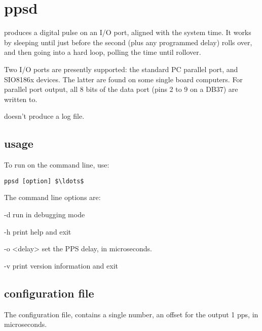 \section{ppsd \label{s:ppsd}}

 produces a digital pulse on an I/O port, aligned with the system time.
It works by sleeping until just before the second (plus any programmed delay) rolls over, 
and then going into a hard loop, polling the time until rollover.

Two I/O ports are presently supported: the standard PC parallel port, and SIO8186x devices.
The latter are found on some single board computers. For parallel port output, all 8 bits 
of the data port (pins 2 to 9 on a DB37) are written to.

 doesn't produce a log file.

\subsection{usage}

To run  on the command line, use:
\begin{lstlisting}[mathescape=true]
ppsd [option] $\ldots$
\end{lstlisting}
The command line options are:
\begin{description*}
	\item[-d]	run in debugging mode
	\item[-h]	print help and exit
	\item[-o \textless delay\textgreater] set the PPS delay, in microseconds.
	\item[-v]	print version information and exit
\end{description*}

\subsection{configuration file}

The configuration file,  contains a single number, an offset for the output 1 pps, in microseconds.

